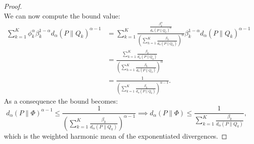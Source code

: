 \documentclass{article}
\begin{document}
\begin{proof}
\begin{equation}
    \end{equation}
    We can now compute the bound value:
    \begin{align*}
        \sum_{k=1}^K \phi_{k}^\alpha \beta_{k}^{1-\alpha} d_{\alpha} (P \| Q_k)^{\alpha-1} & = \sum_{k=1}^K \frac{\frac{\beta_k^{\alpha}}{d_{\alpha}(P \| Q_k)^{\alpha}}} {\left(\sum_{h=1}^K \frac{ \beta_h}{ d_{\alpha}(P \| Q_h)}\right)^{\alpha}} \beta_{k}^{1-\alpha} d_{\alpha} (P \| Q_k)^{\alpha-1} \\
        & = \frac{ \sum_{k=1}^K \frac{\beta_k}{d_{\alpha}(P \| Q_k)} }{\left(\sum_{h=1}^K \frac{ \beta_h}{ d_{\alpha}(P \| Q_h)}\right)^{\alpha}} \\
        & = \frac{1} {\left(\sum_{k=1}^K \frac{ \beta_k}{ d_{\alpha}(P \| Q_k)}\right)^{\alpha-1}}.
    \end{align*}
    As a consequence the bound becomes:
    \begin{equation*}
        d_{\alpha}(P \| \Phi)^{\alpha-1} \le  \frac{1} {\left(\sum_{k=1}^K \frac{\beta_k}{ d_{\alpha}(P \| Q_k)}\right)^{\alpha-1}} \implies  d_{\alpha}(P \| \Phi) \le \frac{1} {\sum_{k=1}^K \frac{ \beta_k}{ d_{\alpha}(P \| Q_k)}},
    \end{equation*}
    which is the weighted harmonic mean of the exponentiated divergences.
\end{proof}

\end{document}
